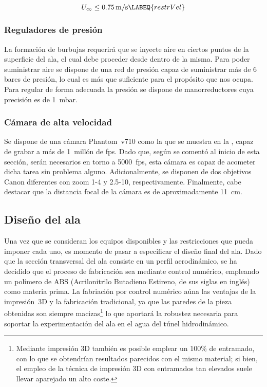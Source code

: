 \begin{equation}
U_{\infty} \leq 0.75\,\mathrm{m/s}
\LABEQ{restrVel}
\end{equation}

\subsubsection*{Reguladores de presión}

La formación de burbujas requerirá que se inyecte aire en ciertos puntos de la superficie del ala, el cual debe proceder desde dentro de la misma. Para poder suministrar aire se dispone de una red de presión capaz de suministrar más de 6 bares de presión, lo cual es más que suficiente para el propósito que nos ocupa. Para regular de forma adecuada la presión se dispone de manorreductores cuya precisión es de 1~mbar. 

\subsubsection*{Cámara de alta velocidad}

Se dispone de una cámara Phantom~v710 como la que se muestra en la , capaz de grabar a más de 1~millón de fps. Dado que, según se comentó al inicio de esta sección, serán necesarios en torno a 5000~fps, esta cámara es capaz de acometer dicha tarea sin problema alguno.  Adicionalmente, se disponen de dos objetivos Canon\textsuperscript{\textregistered} diferentes  con zoom 1-4 y 2.5-10, respectivamente. Finalmente, cabe destacar que la distancia focal de la cámara es de aproximadamente 11~cm.


\subsection{Diseño del ala}

Una vez que se consideran los equipos disponibles y las restricciones que pueda imponer cada uno, es momento de pasar a especificar el diseño final del ala. Dado que la sección transversal del ala consiste en un perfil aerodinámico, se ha decidido que el proceso de fabricación sea mediante control numérico, empleando un polímero de ABS (Acrilonitrilo Butadieno Estireno, de sus siglas en inglés) como materia prima. La fabriación por control numérico aúna las ventajas de la impresión~3D y la fabricación tradicional, ya que las paredes de la pieza obtenidas son siempre macizas\footnote{Mediante impresión 3D también es posible emplear un 100\% de entramado, con lo que se obtendrían resultados parecidos con el mismo material; si bien, el empleo de la técnica de impresión 3D con entramados tan elevados suele llevar aparejado un alto coste.} lo que aportará la robustez necesaria para soportar la experimentación del ala en el agua del túnel hidrodinámico.

